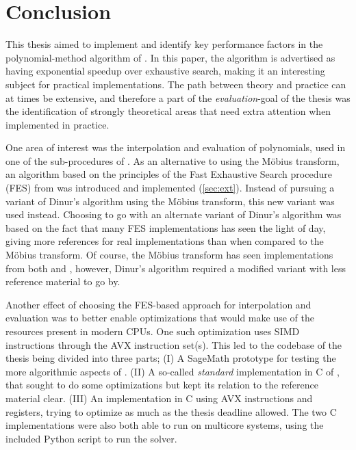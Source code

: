 \chapter{Conclusion} \label{sec:concl}

This thesis aimed to implement and identify key performance factors in the polynomial-method algorithm of \cite{eurocrypt-2021-30841}. In this paper, the algorithm is advertised as having exponential speedup over exhaustive search, making it an interesting subject for practical implementations. The path between theory and practice can at times be extensive, and therefore a part of the \textit{evaluation}-goal of the thesis was the identification of strongly theoretical areas that need extra attention when implemented in practice.

One area of interest was the interpolation and evaluation of polynomials, used in one of the sub-procedures of \cite{eurocrypt-2021-30841}. As an alternative to using the Möbius transform, an algorithm based on the principles of the Fast Exhaustive Search procedure (FES) from \cite{ches-2010-23990} was introduced and implemented (\cref{sec:ext}). Instead of pursuing a variant of Dinur's algorithm using the Möbius transform, this new variant was used instead. Choosing to go with an alternate variant of Dinur's algorithm was based on the fact that many FES implementations has seen the light of day, giving more references for real implementations than when compared to the Möbius transform. Of course, the Möbius transform has seen implementations from both \cite{cryptoeprint:2022/1412} and \cite{joux2009algorithmic}, however, Dinur's algorithm required a modified variant with less reference material to go by.

Another effect of choosing the FES-based approach for interpolation and evaluation was to better enable optimizations that would make use of the resources present in modern CPUs. One such optimization uses SIMD instructions through the AVX instruction set(s). This led to the codebase of the thesis being divided into three parts; (I) A SageMath prototype for testing the more algorithmic aspects of \cite{eurocrypt-2021-30841}. (II) A so-called \textit{standard} implementation in C of \cite{eurocrypt-2021-30841}, that sought to do some optimizations but kept its relation to the reference material clear. (III) An implementation in C using AVX instructions and registers, trying to optimize as much as the thesis deadline allowed. The two C implementations were also both able to run on multicore systems, using the included Python script to run the solver.

